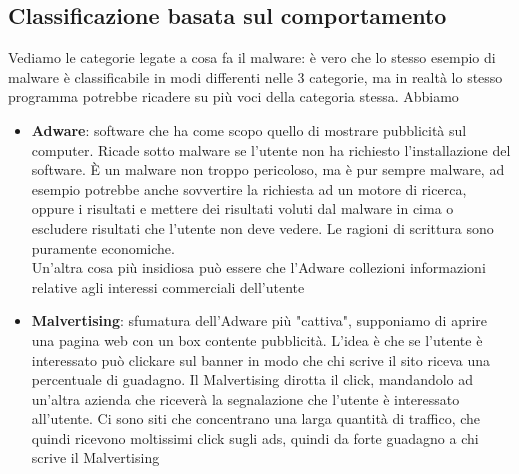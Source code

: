 \documentclass[12pt, oneside]{extbook}
\begin{document}
\subsection{Classificazione basata sul comportamento}
Vediamo le categorie legate a cosa fa il malware: è vero che lo stesso esempio di malware è classificabile in modi differenti nelle 3 categorie, ma in realtà lo stesso programma potrebbe ricadere su più voci della categoria stessa. Abbiamo
\begin{itemize}
\item \textbf{Adware}: software che ha come scopo quello di mostrare pubblicità sul computer. Ricade sotto malware se l'utente non ha richiesto l'installazione del software. È un malware non troppo pericoloso, ma è pur sempre malware, ad esempio potrebbe anche sovvertire la richiesta ad un motore di ricerca, oppure i risultati e mettere dei risultati voluti dal malware in cima o escludere risultati che l'utente non deve vedere. Le ragioni di scrittura sono puramente economiche.\\Un'altra cosa più insidiosa può essere che l'Adware collezioni informazioni relative agli interessi commerciali dell'utente
\item \textbf{Malvertising}: sfumatura dell'Adware più "cattiva", supponiamo di aprire una pagina web con un box contente pubblicità. L'idea è che se l'utente è interessato può clickare sul banner in modo che chi scrive il sito riceva una percentuale di guadagno. Il Malvertising dirotta il click, mandandolo ad un'altra azienda che riceverà la segnalazione che l'utente è interessato all'utente. Ci sono siti che concentrano una larga quantità di traffico, che quindi ricevono moltissimi click sugli ads, quindi da forte guadagno a chi scrive il Malvertising

\end{itemize}
\end{document}

